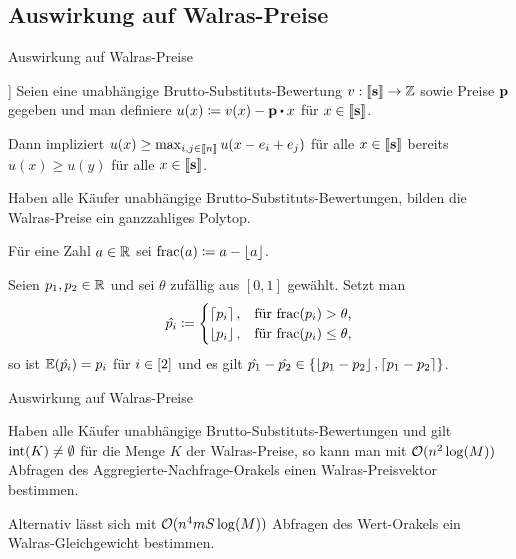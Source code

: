 \subsection{Auswirkung auf Walras-Preise}
\begin{frame}{Auswirkung auf Walras-Preise}
\begin{theorem}[[FY03, Theorem 2.1]]
Seien eine unabhängige Brutto-Substituts-Bewertung $v: \left\llbracket \mathbf{s} \right\rrbracket \rightarrow \mathbb{Z}$ sowie Preise $\mathbf{p}$ gegeben und man definiere $u(x) \coloneqq v(x) - \fp \bcdot x$ für $x\in\left\llbracket \mathbf{s} \right\rrbracket$.

Dann impliziert $u(x)\geq \max_{i,j\in\left\llbracket n \right\rrbracket} u(x - e_i + e_j)$ für alle $x\in\left\llbracket \mathbf{s} \right\rrbracket$ bereits 
$u(x) \geq u(y)$ für alle $x\in\left\llbracket \mathbf{s} \right\rrbracket$.
\end{theorem}

\begin{theorem}
	Haben alle Käufer unabhängige Brutto-Substituts-Bewertungen, bilden die Walras-Preise ein ganzzahliges Polytop.
\end{theorem}
Für eine Zahl $a\in\mathbb{R}$ sei $\operatorname{frac}(a) \coloneqq a - \left\lfloor a \right\rfloor$.
\begin{proposition}
	Seien $p_1,p_2\in\mathbb{R}$ und sei $\theta$ zufällig aus $[0,1]$ gewählt.
	Setzt man \[ \hat{p_i}\coloneqq \begin{cases}
		\left\lceil p_i \right\rceil, & \text{für $\operatorname{frac}(p_i) > \theta$,} \\
		\left\lfloor p_i \right\rfloor, & \text{für $\operatorname{frac}(p_i) \leq \theta$,}
	\end{cases}  \]
	so ist $\mathbb{E}(\hat{p_i}) = p_i$ für $i\in\left[ 2 \right]$ und es gilt $\hat{p_1} - \hat{p_2}\in\{ \left\lfloor p_1 - p_2 \right\rfloor, \left\lceil p_1 - p_2 \right\rceil  \}$.
\end{proposition}
\end{frame}


\begin{frame}{Auswirkung auf Walras-Preise}
\begin{theorem}
	Haben alle Käufer unabhängige Brutto-Substituts-Bewertungen und gilt $\operatorname{int}(K)\neq\emptyset$ für die Menge $K$ der Walras-Preise, so kann man mit $\mathcal{O}(n^2 \log(M))$ Abfragen des Aggregierte-Nachfrage-Orakels einen Walras-Preisvektor bestimmen.
	
	Alternativ lässt sich mit $\mathcal{O}(n^4 m S \log(M))$ Abfragen des Wert-Orakels ein Walras-Gleichgewicht bestimmen.
\end{theorem}
\end{frame}